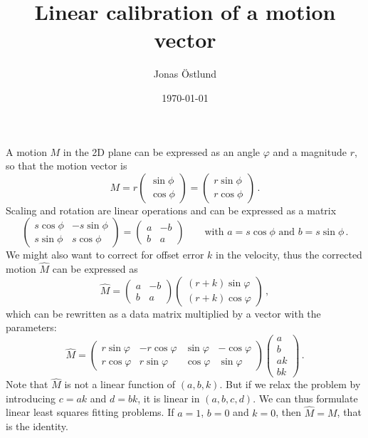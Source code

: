 \documentclass{article}
\author{Jonas Östlund}
\date{\today}
\title{Linear calibration of a motion vector}
\newcommand{\mat}[2]{\left( \begin{array}{#1} #2 \end{array} \right)}
\begin{document}
\maketitle

A motion $M$ in the 2D plane can be expressed as an angle $\varphi$ and a magnitude $r$, so that the motion vector is
\begin{displaymath}
  M = r\mat{c}{
    \sin \phi \\
    \cos \phi
   } =
  \mat{c}{
    r \sin \phi \\
    r \cos \phi
    } \, .
\end{displaymath}
Scaling and rotation are linear operations and can be expressed as a matrix
\begin{displaymath}
\mat{cc}{
  s\cos \phi & -s \sin \phi \\
  s\sin \phi & s \cos \phi
} = \mat{cc}{a & -b \\ b & a} \qquad \text{with $a = s\cos \phi$ and $b = s\sin \phi$} \, .
\end{displaymath}
We might also want to correct for offset error $k$ in the velocity, thus the corrected motion $\hat{M}$ can be expressed as
\begin{displaymath}
\hat{M} = \mat{cc}{a & -b \\ b & a}\mat{c}{(r + k)\sin \varphi \\ (r + k)\cos \varphi} \, ,
\end{displaymath}
which can be rewritten as a data matrix multiplied by a vector with the parameters:
\begin{displaymath}
\hat{M} = \mat{cccc}{r\sin \varphi & -r \cos \varphi & 
  \sin \varphi & -\cos \varphi \\
  r\cos \varphi & r\sin \varphi & \cos \varphi & \sin \varphi}
\mat{c}{a \\ b \\ ak \\ bk} \, .
\end{displaymath}
Note that $\hat{M}$ is not a linear function of $(a, b, k)$. But if we relax the problem by introducing $c = ak$ and $d = bk$, it is linear in $(a, b, c, d)$. We can thus formulate linear least squares fitting problems. If $a = 1$, $b = 0$ and $k = 0$, then $\hat{M} = M$, that is the identity.
\end{document}
